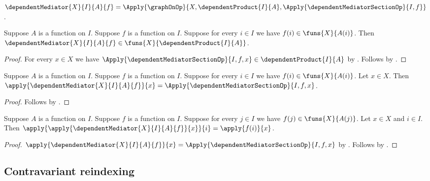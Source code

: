 \begin{definition}\label{dependent_mediator}
    $\dependentMediator{X}{I}{A}{f}
        =\Apply{\graphOnOp}{
            X,\dependentProduct{I}{A},
            \Apply{\dependentMediatorSectionOp}{I,f}}$.
\end{definition}

\begin{proposition}\label{dependent_mediator_type}
    Suppose $A$ is a function on $I$.
    Suppose $f$ is a function on $I$.
    Suppose for every $i\in I$ we have $f(i)\in\funs{X}{A(i)}$.
    Then
        $\dependentMediator{X}{I}{A}{f}\in
            \funs{X}{\dependentProduct{I}{A}}$.
\end{proposition}
\begin{proof}
    For every $x\in X$ we have
        $\Apply{\dependentMediatorSectionOp}{I,f,x}
            \in\dependentProduct{I}{A}$ by
        .
    Follows by
        .
\end{proof}

\begin{proposition}\label{dependent_mediator_apply}
    Suppose $A$ is a function on $I$.
    Suppose $f$ is a function on $I$.
    Suppose for every $i\in I$ we have $f(i)\in\funs{X}{A(i)}$.
    Let $x\in X$.
    Then
        $\apply{\dependentMediator{X}{I}{A}{f}}{x}
            =\Apply{\dependentMediatorSectionOp}{I,f,x}$.
\end{proposition}
\begin{proof}
    Follows by
        .
\end{proof}

\begin{proposition}\label{dependent_mediator_coordinate}
    Suppose $A$ is a function on $I$.
    Suppose $f$ is a function on $I$.
    Suppose for every $j\in I$ we have $f(j)\in\funs{X}{A(j)}$.
    Let $x\in X$ and $i\in I$.
    Then
        $\apply{\apply{\dependentMediator{X}{I}{A}{f}}{x}}{i}
            =\apply{f(i)}{x}$.
\end{proposition}
\begin{proof}
    $\apply{\dependentMediator{X}{I}{A}{f}}{x}
        =\Apply{\dependentMediatorSectionOp}{I,f,x}$ by
        .
    Follows by .
\end{proof}

\subsection{Contravariant reindexing}

